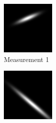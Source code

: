 \documentclass[a4paper, 11pt, titlepage]{article}
\begin{document}
        \begin{figure}
        \centering
        \begin{subfigure}{.33\textwidth}
          \centering
          \includegraphics[width=.9\linewidth]{images/GaussianLine1.png}
          \caption{Measurement 1}
          \label{fig:uncProdsub1}
        \end{subfigure}%
        \begin{subfigure}{.33\textwidth}
          \centering
          \includegraphics[width=.9\linewidth]{images/GaussianLine2.png}

\end{subfigure}
\end{figure}
\end{document}
